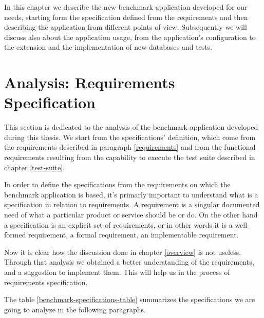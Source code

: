 In this chapter we describe the new benchmark application developed for our needs, starting form the specification defined from the requirements and then describing the application from different points of view. Subsequently we will discuss also about the application usage, from the application's configuration to the extension and the implementation of new databases and tests.

	\section{Analysis: Requirements Specification}	
	
This section is dedicated to the analysis of the benchmark application developed during this thesis. We start from the specifications' definition, which come from the requirements described in paragraph \ref{requirements} and from the functional requirements resulting from the capability to execute the test suite described in chapter \ref{test-suite}.
	
In order to define the specifications from the requirements on which the benchmark application is based, it's primarly important to understand what is a specification in relation to requirements. A requirement is a singular documented need of what a particular product or service should be or do. On the other hand a specification is an explicit set of requirements, or in other words it is a well-formed requirement, a formal requirement, an implementable requirement. 

Now it is clear how the discussion done in chapter \ref{overview} is not useless. Through that analysis we obtained a better understanding of the requirements, and a suggestion to implement them. This will help us in the process of requirements specification. 

The table \ref{benchmark-specifications-table} summarizes the specifications we are going to analyze in the following paragraphs. 

